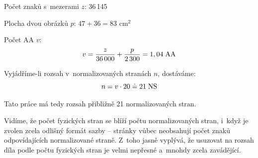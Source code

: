 \documentclass[12pt]{article}%
\begin{document}
Počet znaků s~mezerami $z$: 36\,145

Plocha dvou obrázků $p$: $47 + 36 = 83$ cm$^2$

Počet AA $v$: $$v=\frac z{36\,000}+\frac p{2\,300} = 1,04\;\hbox{AA}$$

Vyjádříme-li rozsah v~normalizovaných stranách $n$, dostáváme:
$$n=v\cdot 20 \doteq 21\;\hbox{NS}$$

Tato práce má tedy rozsah přibližně 21 normalizovaných stran.

Vidíme, že počet fyzických stran se blíží počtu normalizovaných stran, i~když
je zvolen zcela odlišný formát sazby -- stránky vůbec neobsahují počet znaků
odpovídajících normalizované straně. Z~toho jasně vyplývá, že usuzovat na
rozsah díla podle počtu fyzických stran je velmi nepřesné a~mnohdy zcela zavádějící.
\end{document}
